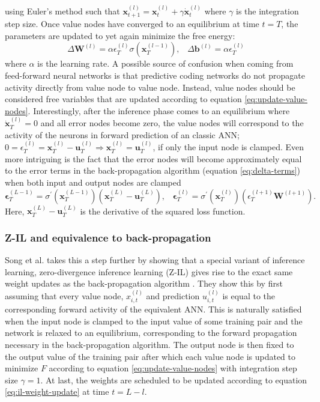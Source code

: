 \documentclass[a4paper,11pt]{article}
\begin{document}
using Euler's method such that $\mathbf{x}_{t+1}^{(l)} = \mathbf{x}_{t}^{(l)} + \gamma \dot{\mathbf{x}}_t^{(l)}$ where $\gamma$ is the integration step size. Once value nodes have converged to an equilibrium at time $t=T$, the parameters are updated to yet again minimize the free energy:
\begin{equation} \label{eq:il-weight-update}
  \Delta \mathbf{W}^{(l)} = \alpha \epsilon_T^{(l)} \sigma(\mathbf{x}_T^{(l-1)}), \hspace{10pt} \Delta \mathbf{b}^{(l)} = \alpha \epsilon_T^{(l)}
\end{equation}
where $\alpha$ is the learning rate. A possible source of confusion when coming from feed-forward neural networks is that predictive coding networks do not propagate activity directly from value node to value node. Instead, value nodes should be considered free variables that are updated according to equation \ref{eq:update-value-nodes}. Interestingly, after the inference phase comes to an equilibrium where $\dot{\mathbf{x}}_T^{(l)} = 0$ and all error nodes become zero, the value nodes will correspond to the activity of the neurons in forward prediction of an classic ANN; $0 = \epsilon_{T}^{(l)}=\mathbf{x}_{T}^{(l)}-\mathbf{u}_{T}^{(l)}  \Rightarrow \mathbf{x}_{T}^{(l)} = \mathbf{u}_{T}^{(l)}$, if only the input node is clamped. Even more intriguing is the fact that the error nodes will become approximately equal to the error terms in the back-propagation algorithm (equation \ref{eq:delta-terms}) when both input and output nodes are clamped 
\begin{equation}
    \mathbf{\epsilon}_T^{(L-1)} = \sigma^{\prime}(\mathbf{x}_{T}^{(L-1)})\left(\mathbf{x}_{T}^{(L)} - \mathbf{u}_T^{(L)} \right), \hspace{10pt} \mathbf{\epsilon}_T^{(l)} = \sigma^{\prime}(\mathbf{x}_{T}^{(l)})\left(\epsilon_{T}^{(l+1)} \mathbf{W}^{(l+1)}\right).
\end{equation}
Here, $\mathbf{x}_{T}^{(L)} - \mathbf{u}_T^{(L)}$ is the derivative of the squared loss function.


\subsubsection{Z-IL and equivalence to back-propagation}
Song et al. takes this a step further by showing that a special variant of inference learning, zero-divergence inference learning (Z-IL) gives rise to the exact same weight updates as the back-propagation algorithm \cite{PredictiveCodingNetworks}. They show this by first assuming that every value node, $x_{i,t}^{(l)}$ and prediction $u_{i,t}^{(l)}$ is equal to the corresponding forward activity of the equivalent ANN. This is naturally satisfied when the input node is clamped to the input value of some training pair and the network is relaxed to an equilibrium, corresponding to the forward propagation necessary in the back-propagation algorithm. The output node is then fixed to the output value of the training pair after which each value node is updated to minimize $F$ according to equation \ref{eq:update-value-nodes} with integration step size $\gamma = 1$. At last, the weights are scheduled to be updated according to equation \ref{eq:il-weight-update} at time $t=L-l$.
\end{document}
